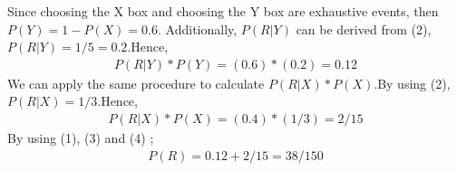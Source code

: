 \documentclass[12pt]{article}
\begin{document}
Since choosing the X box and choosing the Y box are exhaustive events, then $P(Y) = 1-P(X) = 0.6$. Additionally, $P(R|Y)$ can be derived from (2), $P(R|Y) = 1/5 = 0.2$.Hence,
\begin{equation} 
\begin{split}
P(R|Y)*P(Y) = (0.6)*(0.2) = 0.12
\end{split}
\end{equation}
We can apply the same procedure to calculate $P(R|X)*P(X)$.By using (2), $P(R|X) = 1/3$.Hence,
\begin{equation} 
\begin{split}
P(R|X)*P(X) = (0.4)*(1/3) = 2/15
\end{split}
\end{equation}
By using (1), (3) and (4) ;
\begin{equation} 
\begin{split}
P(R) = 0.12 + 2/15 = 38/150
\end{split}
\end{equation}
\end{document}
